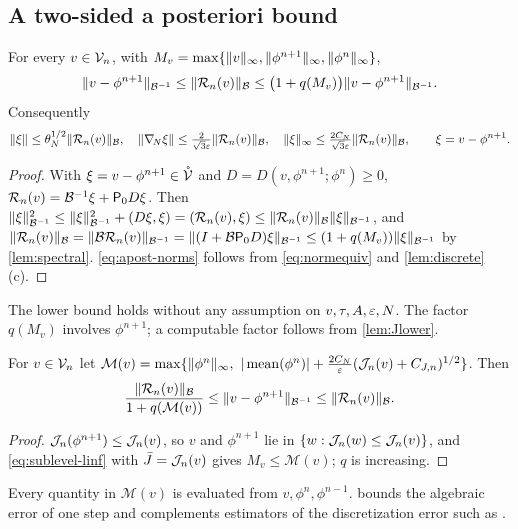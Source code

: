 \subsection{A two-sided a posteriori bound}\label{sec:termination}
\begin{theorem}\label{thm:apost}
For every $v\in\mathcal{V}_n$, with $M_v=\max\{\lVert v\rVert_\infty,\lVert \phi^{n+1}\rVert_\infty,\lVert \phi^n\rVert_\infty\}$,
\begin{equation}\label{eq:apost}
\lVert v-\phi^{n+1}\rVert_{\mathcal{B}^{-1}}\le\lVert \mathcal{R}_n(v)\rVert_{\mathcal{B}}\le\big(1+q(M_v)\big)\lVert v-\phi^{n+1}\rVert_{\mathcal{B}^{-1}} .
\end{equation}
Consequently
\begin{equation}\label{eq:apost-norms}
\lVert \xi\rVert\le\theta_N^{1/2}\lVert \mathcal{R}_n(v)\rVert_{\mathcal{B}},\quad \lVert \nabla_{\!N}\xi\rVert\le\tfrac{2}{\sqrt3\varepsilon}\lVert \mathcal{R}_n(v)\rVert_{\mathcal{B}},\quad \lVert \xi\rVert_\infty\le\tfrac{2C_N}{\sqrt3\varepsilon}\lVert \mathcal{R}_n(v)\rVert_{\mathcal{B}},\qquad \xi=v-\phi^{n+1}.
\end{equation}
\end{theorem}

\begin{proof}
With $\xi=v-\phi^{n+1}\in\mathring{\mathcal{V}}$ and $D=D(v,\phi^{n+1};\phi^n)\ge0$, $\mathcal{R}_n(v)=\mathcal{B}^{-1}\xi+\mathsf{P}_0 D\xi$. Then $\lVert \xi\rVert_{\mathcal{B}^{-1}}^2\le\lVert \xi\rVert_{\mathcal{B}^{-1}}^2+(D\xi,\xi)=(\mathcal{R}_n(v),\xi)\le\lVert \mathcal{R}_n(v)\rVert_{\mathcal{B}}\lVert \xi\rVert_{\mathcal{B}^{-1}}$, and $\lVert \mathcal{R}_n(v)\rVert_{\mathcal{B}}=\lVert \mathcal{B}\mathcal{R}_n(v)\rVert_{\mathcal{B}^{-1}}=\lVert (I+\mathcal{B}\mathsf{P}_0 D)\xi\rVert_{\mathcal{B}^{-1}}\le(1+q(M_v))\lVert \xi\rVert_{\mathcal{B}^{-1}}$ by \cref{lem:spectral}. \eqref{eq:apost-norms} follows from \eqref{eq:normequiv} and \cref{lem:discrete}(c).
\end{proof}
The lower bound holds without any assumption on $v,\tau,A,\varepsilon,N$. The factor $q(M_v)$ involves $\phi^{n+1}$; a computable factor follows from \cref{lem:Jlower}.

\begin{corollary}\label{cor:effectivity}
For $v\in\mathcal{V}_n$ let $\mathcal M(v)=\max\{\nrm{\phi^n}_\infty,\ |\mean(\phi^n)|+\frac{2C_N}{\eps}(\Jn(v)+C_{J,n})^{1/2}\}$. Then
\begin{equation}\label{eq:effectivity}
\frac{\lVert \mathcal{R}_n(v)\rVert_{\mathcal{B}}}{1+q(\mathcal M(v))}\le\lVert v-\phi^{n+1}\rVert_{\mathcal{B}^{-1}}\le\lVert \mathcal{R}_n(v)\rVert_{\mathcal{B}} .
\end{equation}
\end{corollary}

\begin{proof}
$\mathcal{J}_n(\phi^{n+1})\le\mathcal{J}_n(v)$, so $v$ and $\phi^{n+1}$ lie in $\{w:\mathcal{J}_n(w)\le\mathcal{J}_n(v)\}$, and \eqref{eq:sublevel-linf} with $\bar J=\mathcal{J}_n(v)$ gives $M_v\le\mathcal M(v)$; $q$ is increasing.
\end{proof}
Every quantity in $\mathcal M(v)$ is evaluated from $v,\phi^n,\phi^{n-1}$.  bounds the algebraic error of one step and complements estimators of the discretization error such as \cite{ZhouWuWang2026}.


